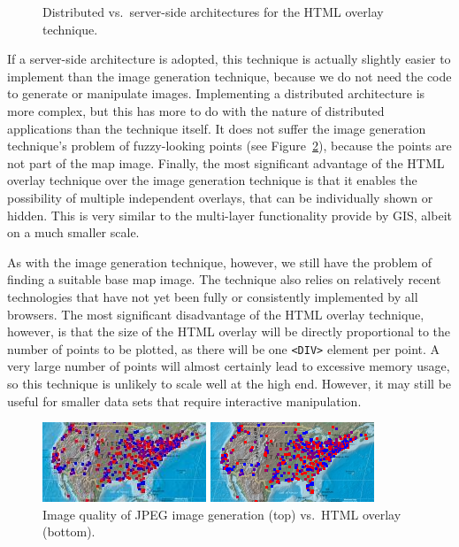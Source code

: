 \documentclass[acmtocl,acmnow]{acmtrans2m}
\begin{document}
\begin{figure}
	\caption{Distributed vs.\ server-side architectures for the HTML
	overlay technique.}
	\label{fig-html-architectures}
\end{figure}


If a server-side architecture is adopted, this technique is actually
slightly easier to implement than the image generation technique,
because we do not need the code to generate or manipulate images.
Implementing a distributed architecture is more complex, but this has
more to do with the nature of distributed applications than the
technique itself. It does not suffer the image generation technique's
problem of fuzzy-looking points (see Figure~\ref{fig-image-quality}),
because the points are not part of the map image. Finally, the most
significant advantage of the HTML overlay technique over the image
generation technique is that it enables the possibility of multiple
independent overlays, that can be individually shown or hidden. This is
very similar to the multi-layer functionality provide by GIS, albeit on
a much smaller scale.

As with the image generation technique, however, we still have the
problem of finding a suitable base map image. The technique also relies
on relatively recent technologies that have not yet been fully or
consistently implemented by all browsers. The most significant
disadvantage of the HTML overlay technique, however, is that the size of
the HTML overlay will be directly proportional to the number of points
to be plotted, as there will be one \verb|<DIV>| element per point. A
very large number of points will almost certainly lead to excessive
memory usage, so this technique is unlikely to scale well at the high
end. However, it may still be useful for smaller data sets that require
interactive manipulation.


\begin{figure}
	\begin{center}
		\includegraphics[scale=1.25]{gd_detail}\medskip
		
		\includegraphics[scale=1.25]{html_detail}
	\end{center}
	\caption{Image quality of JPEG image generation (top) vs.\ HTML
	overlay (bottom).}
	\label{fig-image-quality}
\end{figure}
\end{document}
